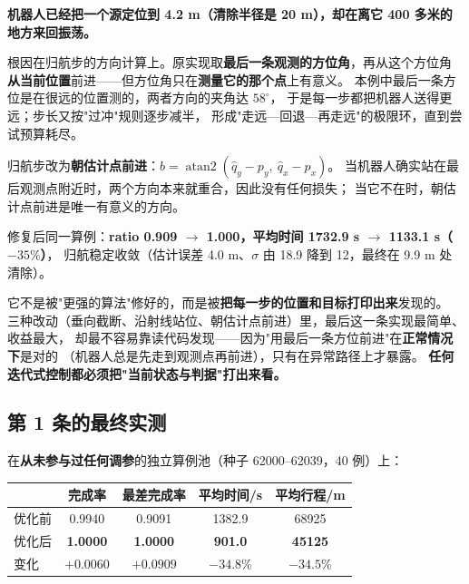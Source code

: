 \textbf{机器人已经把一个源定位到 4.2 m（清除半径是 20 m），却在离它 400 多米的地方来回振荡。}

根因在归航步的方向计算上。原实现取\textbf{最后一条观测的方位角}，再从这个方位角
\textbf{从当前位置}前进——但方位角只在\textbf{测量它的那个点}上有意义。
本例中最后一条方位是在很远的位置测的，两者方向的夹角达 $58^{\circ}$，
于是每一步都把机器人送得更远；步长又按"过冲"规则逐步减半，
形成"走远—回退—再走远"的极限环，直到尝试预算耗尽。

\begin{keybox}[title=改动]
归航步改为\textbf{朝估计点前进}：$b=\operatorname{atan2}(\hat q_y-p_y,\ \hat q_x-p_x)$。
当机器人确实站在最后观测点附近时，两个方向本来就重合，因此没有任何损失；
当它不在时，朝估计点前进是唯一有意义的方向。
\end{keybox}

修复后同一算例：\textbf{ratio 0.909 $\to$ 1.000，平均时间 1732.9 s $\to$ 1133.1 s（$-35\%$）}，
归航稳定收敛（估计误差 4.0 m、$\sigma$ 由 18.9 降到 12，最终在 9.9 m 处清除）。

\begin{warnbox}[title=这条缺陷为什么值得单独记下来]
它不是被"更强的算法"修好的，而是被\textbf{把每一步的位置和目标打印出来}发现的。
三种改动（垂向截断、沿射线站位、朝估计点前进）里，最后这一条实现最简单、收益最大，
却最不容易靠读代码发现——因为"用最后一条方位前进"在\textbf{正常情况下}是对的
（机器人总是先走到观测点再前进），只有在异常路径上才暴露。
\textbf{任何迭代式控制都必须把"当前状态与判据"打出来看。}
\end{warnbox}

\subsection{第 1 条的最终实测}

在\textbf{从未参与过任何调参}的独立算例池（种子 62000--62039，40 例）上：

\begin{center}
\begin{tabular}{lcccc}
\toprule
& 完成率 & 最差完成率 & 平均时间/s & 平均行程/m \\ \midrule
优化前 & 0.9940 & 0.9091 & 1382.9 & 68925 \\
优化后 & \textbf{1.0000} & \textbf{1.0000} & \textbf{901.0} & \textbf{45125} \\
变化 & $+0.0060$ & $+0.0909$ & $\mathbf{-34.8\%}$ & $-34.5\%$ \\
\bottomrule
\end{tabular}
\end{center}

